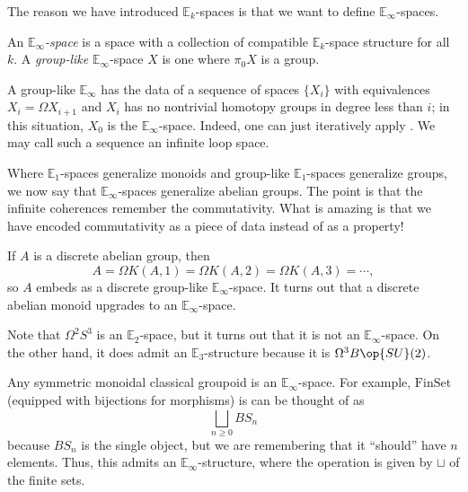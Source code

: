 \documentclass[../notes.tex]{subfiles}
\begin{document}
The reason we have introduced $\mathbb E_k$-spaces is that we want to define $\mathbb E_\infty$-spaces.
\begin{defihelper} 
	An \textit{$\mathbb E_\infty$-space} is a space with a collection of compatible $\mathbb E_k$-space structure for all $k$. A \textit{group-like} $\mathbb E_\infty$-space $X$ is one where $\pi_0X$ is a group.
\end{defihelper}
\begin{remark}
	A group-like $\mathbb E_\infty$ has the data of a sequence of spaces $\{X_i\}$ with equivalences $X_i=\Omega X_{i+1}$ and $X_i$ has no nontrivial homotopy groups in degree less than $i$; in this situation, $X_0$ is the $\mathbb E_\infty$-space. Indeed, one can just iteratively apply . We may call such a sequence an infinite loop space.
\end{remark}
\begin{remark}
	Where $\mathbb E_1$-spaces generalize monoids and group-like $\mathbb E_1$-spaces generalize groups, we now say that $\mathbb E_\infty$-spaces generalize abelian groups. The point is that the infinite coherences remember the commutativity. What is amazing is that we have encoded commutativity as a piece of data instead of as a property!
\end{remark}
\begin{example} \label{ex:discrete-abelian-group-as-e-inf}
	If $A$ is a discrete abelian group, then
	\[A=\Omega K(A,1)=\Omega K(A,2)=\Omega K(A,3)=\cdots,\]
	so $A$ embeds as a discrete group-like $\mathbb E_\infty$-space. It turns out that a discrete abelian monoid upgrades to an $\mathbb E_\infty$-space.
\end{example}
\begin{nex}
	Note that $\Omega^2S^3$ is an $\mathbb E_2$-space, but it turns out that it is not an $\mathbb E_\infty$-space. On the other hand, it does admit an $\mathbb E_3$-structure because it is $\Omega^3B\op{SU}(2)$.
\end{nex}
\begin{example}
	Any symmetric monoidal classical groupoid is an $\mathbb E_\infty$-space. For example, $\mathrm{FinSet}$ (equip\-ped with bijections for morphisms) is can be thought of as
	\[\bigsqcup_{n\ge0}BS_n\]
	because $BS_n$ is the single object, but we are remembering that it ``should'' have $n$ elements. Thus, this admits an $\mathbb E_\infty$-structure, where the operation is given by $\sqcup$ of the finite sets.
\end{example}
\end{document}

